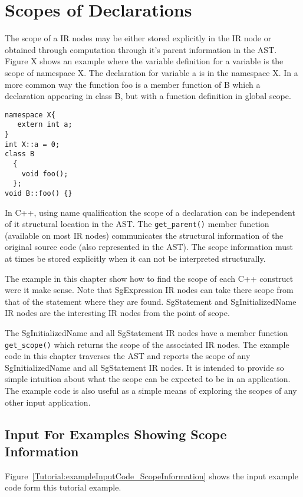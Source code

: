 \chapter{Scopes of Declarations}

     The scope of a IR nodes may be either stored explicitly in the IR node
or obtained through computation through it's parent information in the AST.
Figure X shows an example where the variable definition for a variable is 
the scope of namespace X.  The declaration for variable a is in the namespace X.
In a more common way the function foo is a member function of B which a
declaration appearing in class B, but with a function definition in global scope.
{\mySmallFontSize
\begin{verbatim}
namespace X{
   extern int a;
}
int X::a = 0;
class B
  {
    void foo();
  };
void B::foo() {}
\end{verbatim}
}
In C++, using name qualification the scope of a declaration can be independent of
it structural location in the AST.  The {\tt get\_parent()} member function (available 
on most IR nodes) communicates the structural information of the original source code
(also represented in the AST).  The scope information must at times be stored
explicitly when it can not be interpreted structurally.

   The example in this chapter show how to find the scope of each C++ construct
were it make sense.  Note that SgExpression IR nodes can take there scope from
that of the statement where they are found.  SgStatement and SgInitializedName
IR nodes are the interesting IR nodes from the point of scope.

   The SgInitializedName and all SgStatement IR nodes have a member function
{\tt get\_scope()} which returns the scope of the associated IR nodes.  The
example code in this chapter traverses the AST and reports the scope of any
SgInitializedName and all SgStatement IR nodes.  It is intended to provide
so simple intuition about what the scope can be expected to be in an application.
The example code is also useful as a simple means of exploring the scopes
of any other input application.

\section{Input For Examples Showing Scope Information}

   Figure~\ref{Tutorial:exampleInputCode_ScopeInformation}
shows the input example code form this tutorial example.

